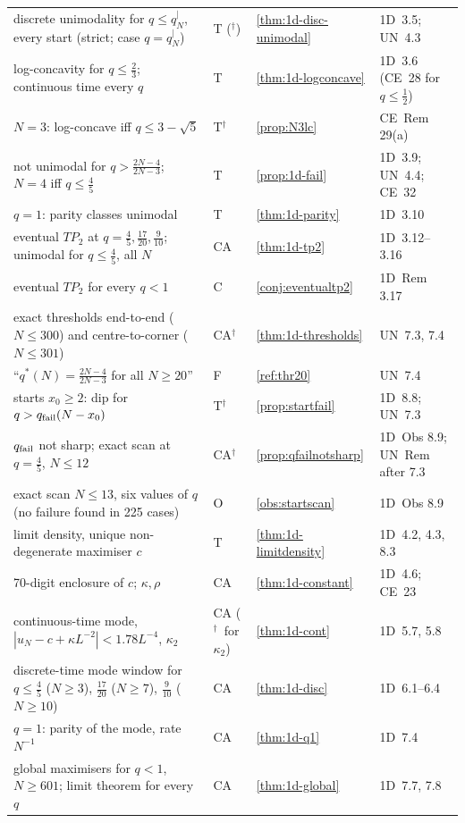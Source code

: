 \documentclass[10pt,a4paper]{article}
\theoremstyle{plain}
\theoremstyle{definition}
\newcommand{\NEW}{\ensuremath{^{\dagger}}}       %
\newcommand{\ONE}{\textsf{1D}}
\newcommand{\UNI}{\textsf{UN}}
\newcommand{\CER}{\textsf{CE}}
\newcommand{\qseg}{q^{|}_N}
\begin{document}
{\begin{longtable}{p{}p{}p{}p{}}
discrete unimodality for $q\le\qseg$, every start (strict; case $q=\qseg$) & T (\NEW) & \ref{thm:1d-disc-unimodal} & \ONE\ 3.5; \UNI\ 4.3\\
log-concavity for $q\le\frac23$; continuous time every $q$ & T & \ref{thm:1d-logconcave} & \ONE\ 3.6 (\CER\ 28 for $q\le\frac12$)\\
$N=3$: log-concave iff $q\le3-\sqrt5$ & T\NEW & \ref{prop:N3lc} & \CER\ Rem 29(a)\\
not unimodal for $q>\frac{2N-4}{2N-3}$; $N=4$ iff $q\le\frac45$ & T & \ref{prop:1d-fail} & \ONE\ 3.9; \UNI\ 4.4; \CER\ 32\\
$q=1$: parity classes unimodal & T & \ref{thm:1d-parity} & \ONE\ 3.10\\
eventual $TP_2$ at $q=\frac45,\frac{17}{20},\frac9{10}$; unimodal for $q\le\frac45$, all $N$ & CA & \ref{thm:1d-tp2} & \ONE\ 3.12--3.16\\
eventual $TP_2$ for every $q<1$ & C & \ref{conj:eventualtp2} & \ONE\ Rem 3.17\\
exact thresholds end-to-end ($N\le300$) and centre-to-corner ($N\le301$) & CA\NEW & \ref{thm:1d-thresholds} & \UNI\ 7.3, 7.4\\
``$q^*(N)=\frac{2N-4}{2N-3}$ for all $N\ge20$'' & F & \ref{ref:thr20} & \UNI\ 7.4\\
starts $x_0\ge2$: dip for $q>q_{\rm fail}(N-x_0)$ & T\NEW & \ref{prop:startfail} & \ONE\ 8.8; \UNI\ 7.3\\
$q_{\rm fail}$ not sharp; exact scan at $q=\frac45$, $N\le12$ & CA\NEW & \ref{prop:qfailnotsharp} & \ONE\ Obs 8.9; \UNI\ Rem after 7.3\\
exact scan $N\le13$, six values of $q$ (no failure found in 225 cases) & O & \ref{obs:startscan} & \ONE\ Obs 8.9\\
limit density, unique non-degenerate maximiser $c$ & T & \ref{thm:1d-limitdensity} & \ONE\ 4.2, 4.3, 8.3\\
70-digit enclosure of $c$; $\kappa,\rho$ & CA & \ref{thm:1d-constant} & \ONE\ 4.6; \CER\ 23\\
continuous-time mode, $|u_N-c+\kappa L^{-2}|<1.78L^{-4}$, $\kappa_2$ & CA (\NEW\ for $\kappa_2$) & \ref{thm:1d-cont} & \ONE\ 5.7, 5.8\\
discrete-time mode window for $q\le\frac45$ ($N\ge3$), $\frac{17}{20}$ ($N\ge7$), $\frac9{10}$ ($N\ge10$) & CA & \ref{thm:1d-disc} & \ONE\ 6.1--6.4\\
$q=1$: parity of the mode, rate $N^{-1}$ & CA & \ref{thm:1d-q1} & \ONE\ 7.4\\
global maximisers for $q<1$, $N\ge601$; limit theorem for every $q$ & CA & \ref{thm:1d-global} & \ONE\ 7.7, 7.8\\

\end{longtable}}
\end{document}
